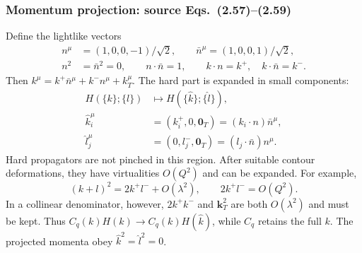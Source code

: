 \documentclass[14pt,a4paper]{extarticle}
\numberwithin{equation}{section}
\begin{document}
\subsubsection{Momentum projection: source Eqs.~(2.57)--(2.59)}
Define the lightlike vectors
\begin{align}
 n^\mu&=(1,0,0,-1)/\sqrt2,\qquad
 \bar n^\mu=(1,0,0,1)/\sqrt2,\\
 n^2&=\bar n^2=0,\qquad n\cdot\bar n=1,\qquad
 k\cdot n=k^+,\quad k\cdot\bar n=k^-.
\end{align}
Then $k^\mu=k^+\bar n^\mu+k^-n^\mu+k_T^\mu$.
The hard part is expanded in small components:
\begin{align}
 H(\{k\};\{l\})&\longmapsto H(\{\hat k\};\{\hat l\}),\\
 \hat k_i^\mu&=(k_i^+,0,\bm0_T)=(k_i\cdot n)\bar n^\mu,\\
 \hat l_j^\mu&=(0,l_j^-,\bm0_T)=(l_j\cdot\bar n)n^\mu.
\end{align}
Hard propagators are not pinched in this region. After suitable contour
deformations, they have virtualities $O(Q^2)$ and can be expanded.
For example,
\begin{equation}
 (k+l)^2=2k^+l^-+O(\lambda^2),\qquad 2k^+l^-=O(Q^2).
\end{equation}
In a collinear denominator, however, $2k^+k^-$ and $\bm k_T^2$
are both $O(\lambda^2)$ and must be kept. Thus
$C_q(k)H(k)\to C_q(k)H(\hat k)$, while $C_q$ retains the full $k$.
The projected momenta obey $\hat k^2=\hat l^2=0$.
\end{document}

